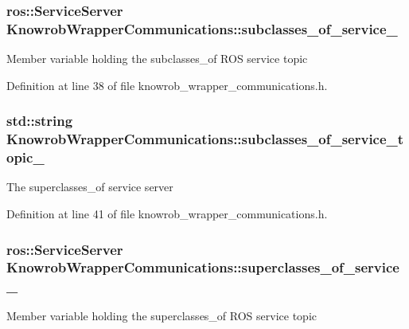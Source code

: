\hypertarget{classKnowrobWrapperCommunications_aa694eb182b48822ca845e34096b17ad4}{
\subsubsection[{subclasses\-\_\-of\-\_\-service\-\_\-}]{\setlength{\rightskip}{0pt plus 5cm}ros\-::\-Service\-Server Knowrob\-Wrapper\-Communications\-::subclasses\-\_\-of\-\_\-service\-\_\-\hspace{0.3cm}{\ttfamily [private]}}}\label{classKnowrobWrapperCommunications_aa694eb182b48822ca845e34096b17ad4}
Member variable holding the subclasses\-\_\-of R\-O\-S service topic 

Definition at line 38 of file knowrob\-\_\-wrapper\-\_\-communications.\-h.

\hypertarget{classKnowrobWrapperCommunications_afbce99db77d63a6a052ebf7041cbc232}{
\subsubsection[{subclasses\-\_\-of\-\_\-service\-\_\-topic\-\_\-}]{\setlength{\rightskip}{0pt plus 5cm}std\-::string Knowrob\-Wrapper\-Communications\-::subclasses\-\_\-of\-\_\-service\-\_\-topic\-\_\-\hspace{0.3cm}{\ttfamily [private]}}}\label{classKnowrobWrapperCommunications_afbce99db77d63a6a052ebf7041cbc232}
The superclasses\-\_\-of service server 

Definition at line 41 of file knowrob\-\_\-wrapper\-\_\-communications.\-h.

\hypertarget{classKnowrobWrapperCommunications_a4f20e98c56e5dd773524db0518ea55a2}{
\subsubsection[{superclasses\-\_\-of\-\_\-service\-\_\-}]{\setlength{\rightskip}{0pt plus 5cm}ros\-::\-Service\-Server Knowrob\-Wrapper\-Communications\-::superclasses\-\_\-of\-\_\-service\-\_\-\hspace{0.3cm}{\ttfamily [private]}}}\label{classKnowrobWrapperCommunications_a4f20e98c56e5dd773524db0518ea55a2}
Member variable holding the superclasses\-\_\-of R\-O\-S service topic 

